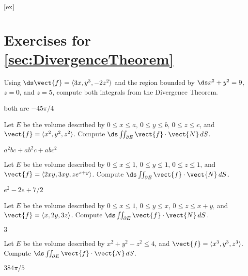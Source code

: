 [ex]
\section*{Exercises for \ref{sec:DivergenceTheorem}}

\begin{enumialphparenastyle}

\begin{ex}
Using $\ds\vect{f}=\langle 3x,y^3,-2z^2\rangle$ and the
region bounded by $\ds x^2+y^2=9$, $z=0$, and $z=5$, compute both
integrals from the Divergence Theorem.
\begin{sol}
	both are $-45\pi/4$
\end{sol}
\end{ex}

\begin{ex}
Let $E$ be the volume described by 
$0\le x\le a$, $0\le y\le b$, $0\le z\le c$, and 
$\vect{f}= \langle x^2,y^2,z^2\rangle$. Compute
$\ds\iint_{\partial E} \vect{f}\cdot \vect{N}\,dS$.
\begin{sol}
	$a^2bc+ab^2c+abc^2$
\end{sol}
\end{ex}

\begin{ex}
Let $E$ be the volume described by 
$0\le x\le 1$, $0\le y\le 1$, $0\le z\le 1$, and 
$\vect{f}= \langle 2xy,3xy,ze^{x+y}\rangle$. Compute
$\ds\iint_{\partial E} \vect{f}\cdot \vect{N}\,dS$.
\begin{sol}
	$e^2-2e+7/2$
\end{sol}
\end{ex}

\begin{ex}
Let $E$ be the volume described by 
$0\le x\le 1$, $0\le y\le x$, $0\le z\le x+y$, and 
$\vect{f}= \langle x,2y,3z\rangle$. Compute
$\ds\iint_{\partial E} \vect{f}\cdot \vect{N}\,dS$.
\begin{sol}
	$3$
\end{sol}
\end{ex}

\begin{ex}
Let $E$ be the volume described by 
$x^2+y^2+z^2\le 4$, and 
$\vect{f}= \langle x^3,y^3,z^3\rangle$. Compute
$\ds\iint_{\partial E} \vect{f}\cdot \vect{N}\,dS$.
\begin{sol}
	$384\pi/5$
\end{sol}
\end{ex}


\end{enumialphparenastyle}
